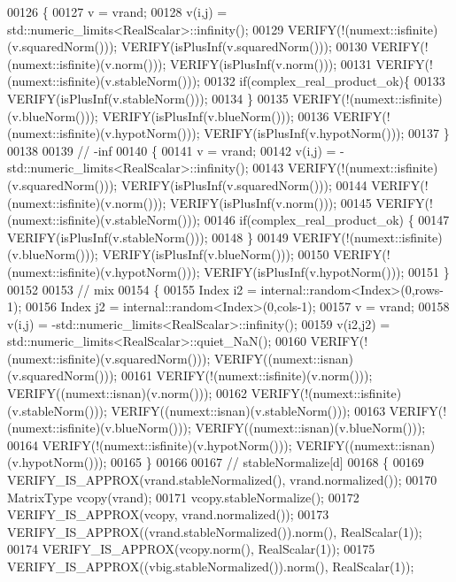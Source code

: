 \begin{DoxyCode}
00126   \{
00127     v = vrand;
00128     v(i,j) = std::numeric\_limits<RealScalar>::infinity();
00129     VERIFY(!(numext::isfinite)(v.squaredNorm()));   VERIFY(isPlusInf(v.squaredNorm()));
00130     VERIFY(!(numext::isfinite)(v.norm()));          VERIFY(isPlusInf(v.norm()));
00131     VERIFY(!(numext::isfinite)(v.stableNorm()));
00132     \textcolor{keywordflow}{if}(complex\_real\_product\_ok)\{
00133       VERIFY(isPlusInf(v.stableNorm()));
00134     \}
00135     VERIFY(!(numext::isfinite)(v.blueNorm()));      VERIFY(isPlusInf(v.blueNorm()));
00136     VERIFY(!(numext::isfinite)(v.hypotNorm()));     VERIFY(isPlusInf(v.hypotNorm()));
00137   \}
00138   
00139   \textcolor{comment}{// -inf}
00140   \{
00141     v = vrand;
00142     v(i,j) = -std::numeric\_limits<RealScalar>::infinity();
00143     VERIFY(!(numext::isfinite)(v.squaredNorm()));   VERIFY(isPlusInf(v.squaredNorm()));
00144     VERIFY(!(numext::isfinite)(v.norm()));          VERIFY(isPlusInf(v.norm()));
00145     VERIFY(!(numext::isfinite)(v.stableNorm()));
00146     \textcolor{keywordflow}{if}(complex\_real\_product\_ok) \{
00147       VERIFY(isPlusInf(v.stableNorm()));
00148     \}
00149     VERIFY(!(numext::isfinite)(v.blueNorm()));      VERIFY(isPlusInf(v.blueNorm()));
00150     VERIFY(!(numext::isfinite)(v.hypotNorm()));     VERIFY(isPlusInf(v.hypotNorm()));
00151   \}
00152   
00153   \textcolor{comment}{// mix}
00154   \{
00155     Index i2 = internal::random<Index>(0,rows-1);
00156     Index j2 = internal::random<Index>(0,cols-1);
00157     v = vrand;
00158     v(i,j) = -std::numeric\_limits<RealScalar>::infinity();
00159     v(i2,j2) = std::numeric\_limits<RealScalar>::quiet\_NaN();
00160     VERIFY(!(numext::isfinite)(v.squaredNorm()));   VERIFY((numext::isnan)(v.squaredNorm()));
00161     VERIFY(!(numext::isfinite)(v.norm()));          VERIFY((numext::isnan)(v.norm()));
00162     VERIFY(!(numext::isfinite)(v.stableNorm()));    VERIFY((numext::isnan)(v.stableNorm()));
00163     VERIFY(!(numext::isfinite)(v.blueNorm()));      VERIFY((numext::isnan)(v.blueNorm()));
00164     VERIFY(!(numext::isfinite)(v.hypotNorm()));     VERIFY((numext::isnan)(v.hypotNorm()));
00165   \}
00166 
00167   \textcolor{comment}{// stableNormalize[d]}
00168   \{
00169     VERIFY\_IS\_APPROX(vrand.stableNormalized(), vrand.normalized());
00170     MatrixType vcopy(vrand);
00171     vcopy.stableNormalize();
00172     VERIFY\_IS\_APPROX(vcopy, vrand.normalized());
00173     VERIFY\_IS\_APPROX((vrand.stableNormalized()).norm(), RealScalar(1));
00174     VERIFY\_IS\_APPROX(vcopy.norm(), RealScalar(1));
00175     VERIFY\_IS\_APPROX((vbig.stableNormalized()).norm(), RealScalar(1));

\end{DoxyCode}
